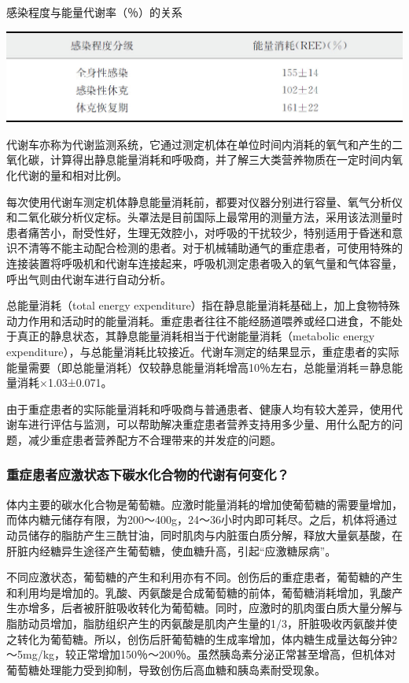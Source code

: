 \begin{table}[htbp]
\centering
\caption{感染程度与能量代谢率（％）的关系}
\label{tab22-2}
\includegraphics{./images/Image00257.jpg}
\end{table}

代谢车亦称为代谢监测系统，它通过测定机体在单位时间内消耗的氧气和产生的二氧化碳，计算得出静息能量消耗和呼吸商，并了解三大类营养物质在一定时间内氧化代谢的量和相对比例。

每次使用代谢车测定机体静息能量消耗前，都要对仪器分别进行容量、氧气分析仪和二氧化碳分析仪定标。头罩法是目前国际上最常用的测量方法，采用该法测量时患者痛苦小，耐受性好，生理无效腔小，对呼吸的干扰较少，特别适用于昏迷和意识不清等不能主动配合检测的患者。对于机械辅助通气的重症患者，可使用特殊的连接装置将呼吸机和代谢车连接起来，呼吸机测定患者吸入的氧气量和气体容量，呼出气则由代谢车进行自动分析。

总能量消耗（total energy
expenditure）指在静息能量消耗基础上，加上食物特殊动力作用和活动时的能量消耗。重症患者往往不能经肠道喂养或经口进食，不能处于真正的静息状态，其静息能量消耗相当于代谢能量消耗（metabolic
energy
expenditure），与总能量消耗比较接近。代谢车测定的结果显示，重症患者的实际能量需要（即总能量消耗）仅较静息能量消耗增高10％左右，总能量消耗＝静息能量消耗×1.03±0.071。

由于重症患者的实际能量消耗和呼吸商与普通患者、健康人均有较大差异，使用代谢车进行评估与监测，可以帮助解决重症患者营养支持用多少量、用什么配方的问题，减少重症患者营养配方不合理带来的并发症的问题。

\subsubsection{重症患者应激状态下碳水化合物的代谢有何变化？}

体内主要的碳水化合物是葡萄糖。应激时能量消耗的增加使葡萄糖的需要量增加，而体内糖元储存有限，为200～400g，24～36小时内即可耗尽。之后，机体将通过动员储存的脂肪产生三酰甘油，同时肌肉与内脏蛋白质分解，释放大量氨基酸，在肝脏内经糖异生途径产生葡萄糖，使血糖升高，引起“应激糖尿病”。

不同应激状态，葡萄糖的产生和利用亦有不同。创伤后的重症患者，葡萄糖的产生和利用均是增加的。乳酸、丙氨酸是合成葡萄糖的前体，葡萄糖消耗增加，乳酸产生亦增多，后者被肝脏吸收转化为葡萄糖。同时，应激时的肌肉蛋白质大量分解与脂肪动员增加，脂肪组织产生的丙氨酸是肌肉产生量的1/3，肝脏吸收丙氨酸并使之转化为葡萄糖。所以，创伤后肝葡萄糖的生成率增加，体内糖生成量达每分钟2～5mg/kg，较正常增加150％～200％。虽然胰岛素分泌正常甚至增高，但机体对葡萄糖处理能力受到抑制，导致创伤后高血糖和胰岛素耐受现象。

